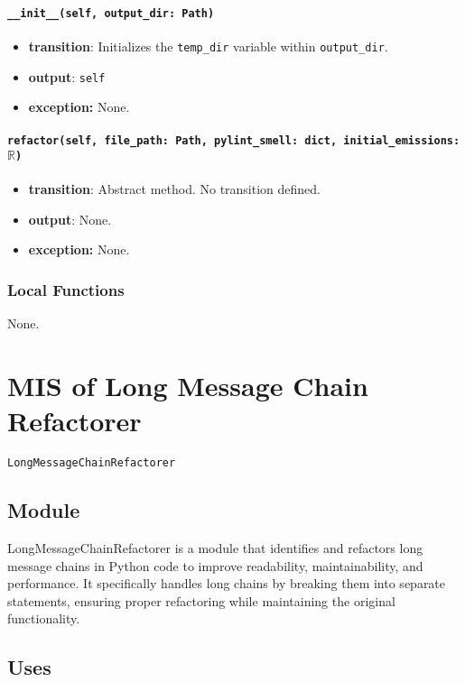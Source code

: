 \documentclass[12pt, titlepage]{article}
\begin{document}
\paragraph{\texttt{\_\_init\_\_(self, output\_dir: Path)}}
\begin{itemize}
  \item \textbf{transition}: Initializes the \texttt{temp\_dir} variable within \texttt{output\_dir}.
  \item \textbf{output}: \texttt{self}
  \item \textbf{exception:} None.
\end{itemize}

\paragraph{\texttt{refactor(self, file\_path: Path, pylint\_smell: dict, initial\_emissions: $\mathbb{R}$)}}
\begin{itemize}
  \item \textbf{transition}: Abstract method. No transition defined.
  \item \textbf{output}: None.
  \item \textbf{exception:} None.
\end{itemize}

\subsubsection{Local Functions}
None.

\newpage


\section{MIS of Long Message Chain Refactorer} \label{mis:LMC}

\texttt{LongMessageChainRefactorer}

\subsection{Module}

LongMessageChainRefactorer is a module that identifies and refactors long message chains in Python code to improve readability, maintainability, and performance. It specifically handles long chains by breaking them into separate statements, ensuring proper refactoring while maintaining the original functionality.

\subsection{Uses}
\end{document}
